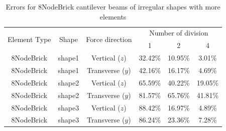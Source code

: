 \documentclass[fleqn,11pt]{article}
\begin{document}
\begin{table}[H]
  \centering
  \caption{Errors for 8NodeBrick cantilever beams of irregular shapes with more elements}
  \label{table Errors for 8NodeBrick cantilever beams of irregular shapes with more elements}
\begin{tabular}{|c|c|c|c|c|c|}
\hline
\multirow{2}{*}{Element Type} & \multirow{2}{*}{Shape}  & \multirow{2}{*}{Force direction}  & \multicolumn{3}{|c|}{Number of division} \\  \cline{4-6}
                        &        &                  &  1 &  2 &  4  \\ \hline
8NodeBrick   & shape1      & Vertical ($z$)   & 32.42\% & 10.95\% & 3.01\%     \\ \hline
8NodeBrick   & shape1      & Transverse ($y$) & 42.16\% & 16.17\% & 4.69\%     \\ \hline
8NodeBrick   & shape2      & Vertical ($z$)   & 65.59\% & 40.22\% & 19.05\%    \\ \hline
8NodeBrick   & shape2      & Transverse ($y$) & 81.57\% & 65.76\% & 41.81\%    \\ \hline
8NodeBrick   & shape3      & Vertical ($z$)   & 88.42\% & 16.97\% & 4.89\%     \\ \hline
8NodeBrick   & shape3      & Transverse ($y$) & 86.24\% & 23.36\% & 7.28\%     \\
\hline
\end{tabular}
\end{table}



\end{document}
